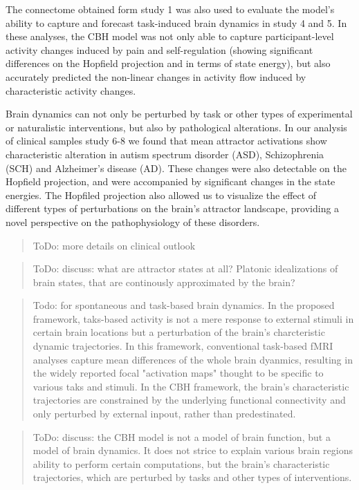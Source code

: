 \documentclass{article}
\begin{document}
The connectome obtained form study 1 was also used to evaluate the model's ability to capture and forecast task-induced
brain dynamics in study 4 and 5. In these analyses, the CBH model was not only able to capture participant-level
activity changes induced by pain and self-regulation (showing significant differences on the Hopfield projection and in
terms of state energy), but also accurately predicted the non-linear changes in activity flow induced by characteristic
activity changes.

Brain dynamics can not only be perturbed by task or other types of experimental or naturalistic interventions, but also
by pathological alterations. In our analysis of clinical samples study 6-8 we found that mean attractor activations show
characteristic alteration in autism spectrum disorder (ASD), Schizophrenia (SCH) and Alzheimer's disease (AD). These
changes were also detectable on the Hopfield projection, and were accompanied by significant changes in the state
energies. The Hopfiled projection also allowed us to visualize the effect of different types of perturbations on the
brain's attractor landscape, providing a novel perspective on the pathophysiology of these disorders.

\begin{quote}
ToDo: more details on clinical outlook
\end{quote}

\begin{quote}
ToDo: discuss: what are attractor states at all? Platonic idealizations of brain states, that are continously approximated by the brain?
\end{quote}

\begin{quote}
Todo: for spontaneous and task-based brain dynamics. In the proposed framework, taks-based activity is not a mere response to external stimuli in certain brain locations but a perturbation of the brain's charcteristic dynamic trajectories. In this framework, conventional task-based fMRI analyses capture mean differences of the whole brain dyanmics, resulting in the widely reported focal "activation maps" thought to be specific to various taks and stimuli. In the CBH framework, the brain's characteristic trajectories are constrained by the underlying functional connectivity and only perturbed by external inpout, rather than predestinated.
\end{quote}

\begin{quote}
ToDo: discuss: the CBH model is not a model of brain function, but a model of brain dynamics. It does not strice to explain various brain regions ability to perform certain computations, but the brain's characteristic trajectories, which are perturbed by tasks and other types of interventions.
\end{quote}
\end{document}

